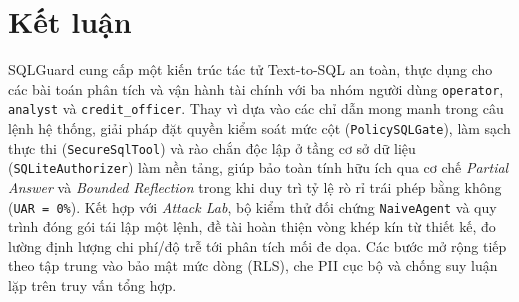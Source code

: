 \section{Kết luận}
\label{sec:conclusion}

\noindent SQLGuard cung cấp một kiến trúc tác tử Text-to-SQL an toàn, thực dụng cho các bài toán phân tích và vận hành tài chính với ba nhóm người dùng \texttt{operator}, \texttt{analyst} và \texttt{credit\_officer}. Thay vì dựa vào các chỉ dẫn mong manh trong câu lệnh hệ thống, giải pháp đặt quyền kiểm soát mức cột (\texttt{PolicySQLGate}), làm sạch thực thi (\texttt{SecureSqlTool}) và rào chắn độc lập ở tầng cơ sở dữ liệu (\texttt{SQLiteAuthorizer}) làm nền tảng, giúp bảo toàn tính hữu ích qua cơ chế \textit{Partial Answer} và \textit{Bounded Reflection} trong khi duy trì tỷ lệ rò rỉ trái phép bằng không (\texttt{UAR = 0\%}). Kết hợp với \textit{Attack Lab}, bộ kiểm thử đối chứng \texttt{NaiveAgent} và quy trình đóng gói tái lập một lệnh, đề tài hoàn thiện vòng khép kín từ thiết kế, đo lường định lượng chi phí/độ trễ tới phân tích mối đe dọa. Các bước mở rộng tiếp theo tập trung vào bảo mật mức dòng (RLS), che PII cục bộ và chống suy luận lặp trên truy vấn tổng hợp.
